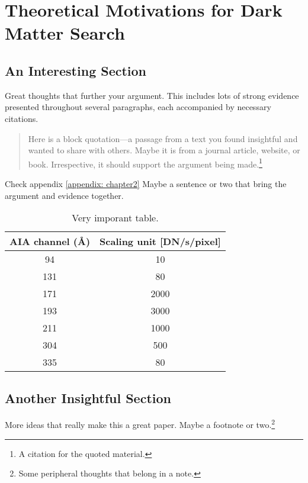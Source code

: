 \chapter{Theoretical Motivations for Dark Matter Search}
\label{chapter:two}
\section{An Interesting Section}

Great thoughts that further your argument. This includes lots of strong evidence presented throughout several paragraphs, each accompanied by necessary citations.
\begin{quotation}
    \noindent Here is a block quotation---a passage from a text you found insightful and wanted to share with others. Maybe it is from a journal article, website, or book. Irrespective, it should support the argument being made.\footnote{A citation for the quoted material.}
\end{quotation}

Check appendix \ref{appendix: chapter2}
Maybe a sentence or two that bring the argument and evidence together.\citep{dos_santos_2020}

\begin{table}[h!]
  \centering
  \caption{Very imporant table.}
  \label{tab:average_channels}
  \begin{tabular}{cc}
    \toprule
     AIA channel (\AA) &  Scaling unit [DN/s/pixel] \\
     \midrule
      94 &   10  \\
      131 &   80  \\
      171 & 2000  \\
      193 & 3000  \\
      211 & 1000  \\
      304 &  500  \\
      335 &   80  \\
      \bottomrule
  \end{tabular}
\end{table}


\section{Another Insightful Section}

More ideas that really make this a great paper. Maybe a footnote or two.\footnote{Some peripheral thoughts that belong in a note.}
